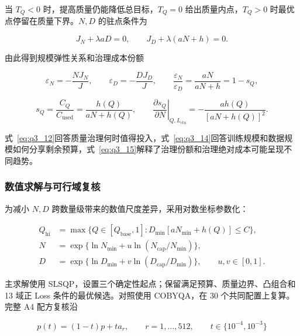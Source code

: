 当 $T_Q<0$ 时，提高质量仍能降低总目标，$T_Q=0$ 给出质量内点，$T_Q>0$ 时最优点停留在质量下界。$N,D$ 的驻点条件为

\begin{equation}\label{eq:q3_13}
    J_N+\lambda aD=0,\qquad J_D+\lambda(aN+h)=0.
\end{equation}

由此得到规模弹性关系和治理成本份额

\begin{equation}\label{eq:q3_14}
    \varepsilon_N=-\frac{NJ_N}{J},\qquad
    \varepsilon_D=-\frac{DJ_D}{J},\qquad
    \frac{\varepsilon_N}{\varepsilon_D}=\frac{aN}{aN+h}=1-s_Q,
\end{equation}

\begin{equation}\label{eq:q3_15}
    s_Q=\frac{C_Q}{C_{\mathrm{used}}}=\frac{h(Q)}{aN+h(Q)},\qquad
    \left.\frac{\partial s_Q}{\partial N}\right|_{Q,L_{\mathrm{ctx}}}
    =-\frac{ah(Q)}{[aN+h(Q)]^2}.
\end{equation}

式~\eqref{eq:q3_12}回答质量治理何时值得投入，式~\eqref{eq:q3_14}回答训练规模和数据规模如何分享剩余预算，式~\eqref{eq:q3_15}解释了治理份额和治理绝对成本可能呈现不同趋势。

\subsubsection{数值求解与可行域复核}

为减小 $N,D$ 跨数量级带来的数值尺度差异，采用对数坐标参数化：

\begin{equation}\label{eq:q3_16}
    \begin{aligned}
        Q_{\mathrm{hi}} & =\max\{Q\in[Q_{\mathrm{base}},1]:D_{\min}[aN_{\min}+h(Q)]\le C\},         \\
        N               & =\exp\{\ln N_{\min}+u\ln(N_{\mathrm{cap}}/N_{\min})\},                    \\
        D               & =\exp\{\ln D_{\min}+v\ln(D_{\mathrm{cap}}/D_{\min})\},\qquad u,v\in[0,1].
    \end{aligned}
\end{equation}

主求解使用 SLSQP，设置三个确定性起点；保留满足预算、质量边界、凸组合和 13 域正 Loss 条件的最优候选。对照使用 COBYQA，在 30 个共同配置上复算。完整 A4 配方复核沿

\begin{equation}\label{eq:q3_17}
    p(t)=(1-t)p+ta_r,\qquad r=1,\ldots,512,\qquad t\in\{10^{-4},10^{-3}\}
\end{equation}

